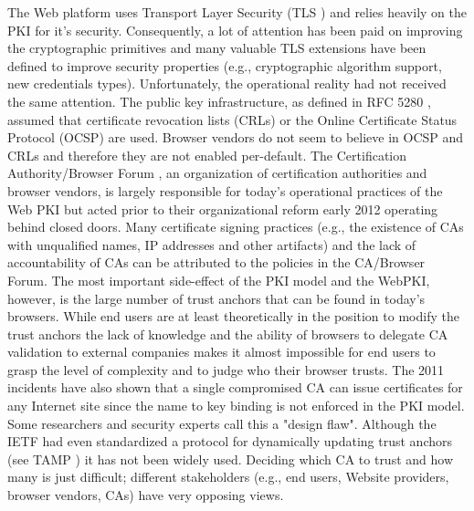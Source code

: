 \documentclass[a4paper, 10pt]{IEEEtran}
\begin{document}
The Web platform uses Transport Layer Security (TLS \cite{rfc5246}) and relies heavily on the PKI for it's security. Consequently, a lot of attention has been paid on improving the cryptographic primitives and many valuable TLS extensions have been defined to improve security properties (e.g., cryptographic algorithm support, new credentials types). Unfortunately, the operational reality had not received the same attention. The public key infrastructure, as defined in RFC 5280 \cite{rfc5280}, assumed that certificate revocation lists (CRLs) or the Online Certificate Status Protocol (OCSP) \cite{rfc2560} are used. Browser vendors do not seem to believe in OCSP and CRLs and therefore they are not enabled per-default. The Certification Authority/Browser Forum \cite{CABrowserForum}, an organization of  certification authorities and browser vendors, is largely responsible for today's operational practices of the Web PKI but acted prior to their organizational reform early 2012 operating behind closed doors. Many certificate signing practices (e.g., the existence of CAs with unqualified names, IP addresses and other artifacts) and the lack of accountability of CAs can be attributed to the policies in the CA/Browser Forum. The most important side-effect of the PKI model and the WebPKI, however, is the large number of trust anchors that can be found in today's browsers. While end users are at least theoretically in the position to modify the trust anchors the lack of knowledge and the ability of browsers to delegate CA validation to external companies makes it almost impossible for end users to grasp the level of complexity and to judge who their browser trusts. The 2011 incidents have also shown that a single compromised CA can issue certificates for any Internet site since the name to key binding is not enforced in the PKI model. Some researchers and security experts call this a "design flaw". Although the IETF had even standardized a protocol for dynamically updating trust anchors (see TAMP \cite{rfc5934}) it has not been widely used. Deciding which CA to trust and how many is just difficult; different stakeholders (e.g., end users, Website providers, browser vendors, CAs) have very opposing views. 
\end{document}

